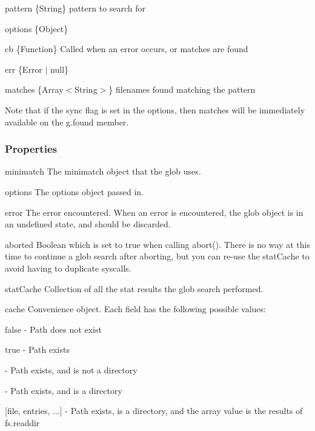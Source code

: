 \begin{DoxyItemize}
\item {\ttfamily pattern} \{String\} pattern to search for
\item {\ttfamily options} \{Object\}
\item {\ttfamily cb} \{Function\} Called when an error occurs, or matches are found
\begin{DoxyItemize}
\item {\ttfamily err} \{Error $\vert$ null\}
\item {\ttfamily matches} \{Array$<$\+String$>$\} filenames found matching the pattern
\end{DoxyItemize}
\end{DoxyItemize}

Note that if the {\ttfamily sync} flag is set in the options, then matches will be immediately available on the {\ttfamily g.\+found} member.

\subsubsection*{Properties}


\begin{DoxyItemize}
\item {\ttfamily minimatch} The minimatch object that the glob uses.
\item {\ttfamily options} The options object passed in.
\item {\ttfamily error} The error encountered. When an error is encountered, the glob object is in an undefined state, and should be discarded.
\item {\ttfamily aborted} Boolean which is set to true when calling {\ttfamily abort()}. There is no way at this time to continue a glob search after aborting, but you can re-\/use the stat\+Cache to avoid having to duplicate syscalls.
\item {\ttfamily stat\+Cache} Collection of all the stat results the glob search performed.
\item {\ttfamily cache} Convenience object. Each field has the following possible values\+:
\begin{DoxyItemize}
\item {\ttfamily false} -\/ Path does not exist
\item {\ttfamily true} -\/ Path exists
\item {} -\/ Path exists, and is not a directory
\item {} -\/ Path exists, and is a directory
\item {\ttfamily \mbox{[}file, entries, ...\mbox{]}} -\/ Path exists, is a directory, and the array value is the results of {\ttfamily fs.\+readdir}
\end{DoxyItemize}
\end{DoxyItemize}

